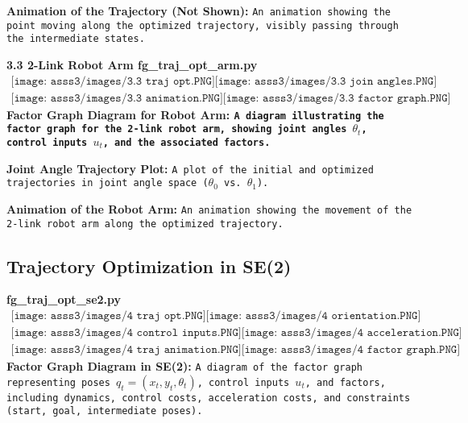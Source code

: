 \documentclass{article}
\begin{document}
\textbf{\newline Animation of the Trajectory (Not Shown):} 
\texttt{An animation showing the point moving along the optimized trajectory, visibly passing through the intermediate states.\newline}


\noindent\bfseries{3.3 2-Link Robot Arm}
\bfseries{\newline fg\_traj\_opt\_arm.py}
\begin{align*}
    \texttt{[image: asss3/images/3.3 traj opt.PNG]}
    \texttt{[image: asss3/images/3.3 join angles.PNG]}
\end{align*}
\begin{align*}
    \texttt{[image: asss3/images/3.3 animation.PNG]}
    \texttt{[image: asss3/images/3.3 factor graph.PNG]}
\end{align*}
\textbf{Factor Graph Diagram for Robot Arm:} 
\texttt{A diagram illustrating the factor graph for the 2-link robot arm, showing joint angles \( \theta_t \), control inputs \( u_t \), and the associated factors.}

\textbf{\newline Joint Angle Trajectory Plot:} 
\texttt{A plot of the initial and optimized trajectories in joint angle space (\( \theta_0 \) vs. \( \theta_1 \)).}

\textbf{\newline Animation of the Robot Arm:} 
\texttt{An animation showing the movement of the 2-link robot arm along the optimized trajectory.}

\subsection*{Trajectory Optimization in SE(2)}
\textbf{fg\_traj\_opt\_se2.py}
\begin{align*}
    \texttt{[image: asss3/images/4 traj opt.PNG]}
    \texttt{[image: asss3/images/4 orientation.PNG]}
\end{align*}
\begin{align*}
    \texttt{[image: asss3/images/4 control inputs.PNG]}
    \texttt{[image: asss3/images/4 acceleration.PNG]}
\end{align*}
\begin{align*}
    \texttt{[image: asss3/images/4 traj animation.PNG]}
    \texttt{[image: asss3/images/4 factor graph.PNG]}
\end{align*}
\textbf{Factor Graph Diagram in SE(2):} 
\texttt{A diagram of the factor graph representing poses \( q_t = (x_t, y_t, \theta_t) \), control inputs \( u_t \), and factors, including dynamics, control costs, acceleration costs, and constraints (start, goal, intermediate poses).}
\end{document}
